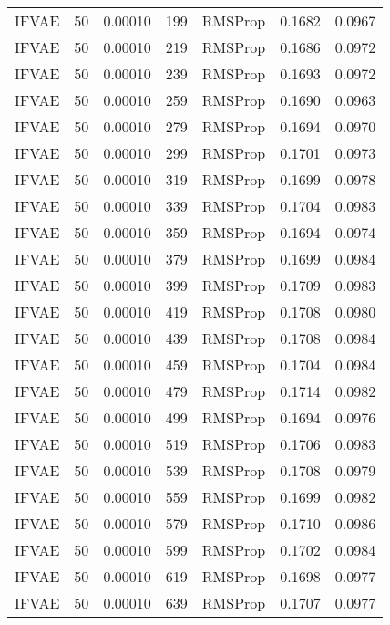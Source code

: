 \begin{tabular}{llrllrr}
   IFVAE &   50 &  0.00010 &   199 &   RMSProp &  0.1682 &       0.0967 \\
   IFVAE &   50 &  0.00010 &   219 &   RMSProp &  0.1686 &       0.0972 \\
   IFVAE &   50 &  0.00010 &   239 &   RMSProp &  0.1693 &       0.0972 \\
   IFVAE &   50 &  0.00010 &   259 &   RMSProp &  0.1690 &       0.0963 \\
   IFVAE &   50 &  0.00010 &   279 &   RMSProp &  0.1694 &       0.0970 \\
   IFVAE &   50 &  0.00010 &   299 &   RMSProp &  0.1701 &       0.0973 \\
   IFVAE &   50 &  0.00010 &   319 &   RMSProp &  0.1699 &       0.0978 \\
   IFVAE &   50 &  0.00010 &   339 &   RMSProp &  0.1704 &       0.0983 \\
   IFVAE &   50 &  0.00010 &   359 &   RMSProp &  0.1694 &       0.0974 \\
   IFVAE &   50 &  0.00010 &   379 &   RMSProp &  0.1699 &       0.0984 \\
   IFVAE &   50 &  0.00010 &   399 &   RMSProp &  0.1709 &       0.0983 \\
   IFVAE &   50 &  0.00010 &   419 &   RMSProp &  0.1708 &       0.0980 \\
   IFVAE &   50 &  0.00010 &   439 &   RMSProp &  0.1708 &       0.0984 \\
   IFVAE &   50 &  0.00010 &   459 &   RMSProp &  0.1704 &       0.0984 \\
   IFVAE &   50 &  0.00010 &   479 &   RMSProp &  0.1714 &       0.0982 \\
   IFVAE &   50 &  0.00010 &   499 &   RMSProp &  0.1694 &       0.0976 \\
   IFVAE &   50 &  0.00010 &   519 &   RMSProp &  0.1706 &       0.0983 \\
   IFVAE &   50 &  0.00010 &   539 &   RMSProp &  0.1708 &       0.0979 \\
   IFVAE &   50 &  0.00010 &   559 &   RMSProp &  0.1699 &       0.0982 \\
   IFVAE &   50 &  0.00010 &   579 &   RMSProp &  0.1710 &       0.0986 \\
   IFVAE &   50 &  0.00010 &   599 &   RMSProp &  0.1702 &       0.0984 \\
   IFVAE &   50 &  0.00010 &   619 &   RMSProp &  0.1698 &       0.0977 \\
   IFVAE &   50 &  0.00010 &   639 &   RMSProp &  0.1707 &       0.0977 \\

\end{tabular}
